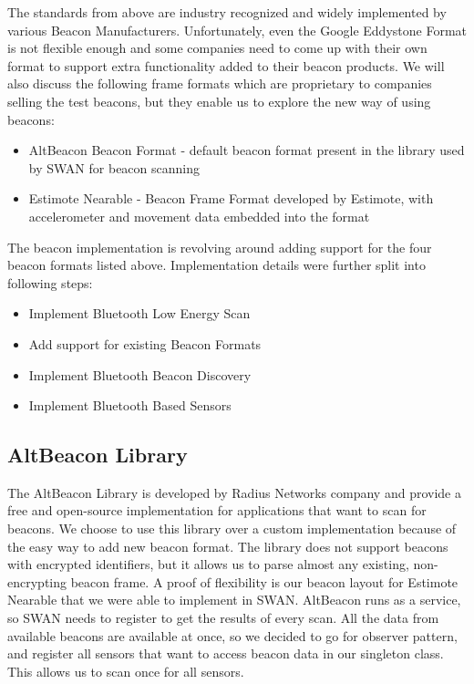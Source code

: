 The standards from above are industry recognized and widely implemented by various Beacon Manufacturers.
Unfortunately, even the Google Eddystone Format is not flexible enough and some companies need to come up with their own format to support extra functionality 
added to  their beacon products. We will also discuss the following frame formats which are proprietary to companies selling the test beacons, but they enable us to explore the
new way of using beacons:
\begin{itemize}
 \item AltBeacon Beacon Format - default beacon format present in the library used by SWAN for beacon scanning
 \item Estimote Nearable - Beacon Frame Format developed by Estimote\cite{estimote_company}, with accelerometer and movement data embedded into the format
\end{itemize}

The beacon implementation is revolving around adding support for the four beacon formats listed above. Implementation details were further split into 
following steps:
\begin{itemize}
 \item Implement Bluetooth Low Energy Scan
 \item Add support for existing Beacon Formats
 \item Implement Bluetooth Beacon Discovery
 \item Implement Bluetooth Based Sensors
\end{itemize}

\subsection{AltBeacon Library}
The AltBeacon Library is developed by Radius Networks company and provide a free and open-source implementation for applications that want to scan for beacons.
We choose to use this library over a custom implementation because of the easy way to add new beacon format. The library does not support beacons with encrypted 
identifiers, but it allows us to parse almost any existing, non-encrypting beacon frame. A proof of flexibility is our beacon layout for Estimote Nearable that we were able to 
implement in SWAN.
AltBeacon runs as a service, so SWAN needs to register to get the results of every scan. All the data from available beacons are available at once, so we decided to go for observer 
pattern, and register all sensors that want to access beacon data in our singleton class. This allows us to scan once for all sensors.

